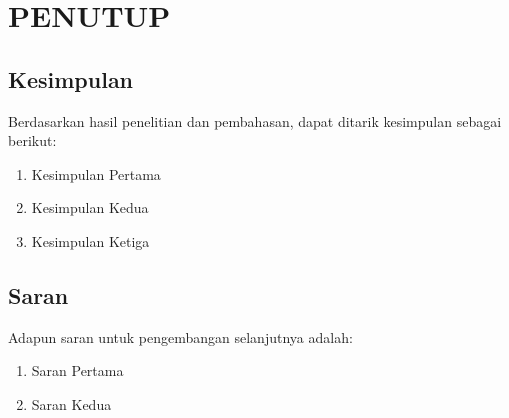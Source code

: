 \section{PENUTUP}
\onehalfspacing

\subsection{Kesimpulan}
\justifying

Berdasarkan hasil penelitian dan pembahasan, dapat ditarik kesimpulan sebagai berikut:

\begin{enumerate}
    \item Kesimpulan Pertama
    \item Kesimpulan Kedua
    \item Kesimpulan Ketiga
\end{enumerate}

\subsection{Saran}
\justifying

Adapun saran untuk pengembangan selanjutnya adalah:

\begin{enumerate}
    \item Saran Pertama
    \item Saran Kedua
\end{enumerate}
